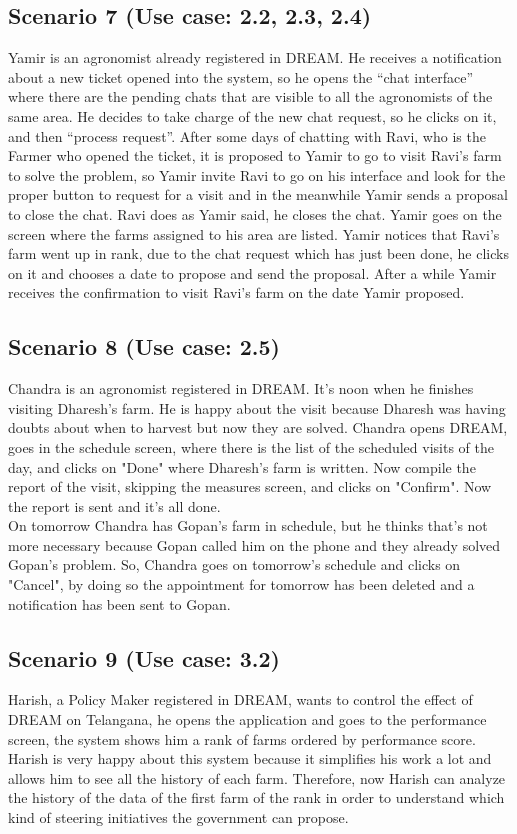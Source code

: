 \documentclass[10pt]{report}
\begin{document}
\subsection{Scenario 7 (Use case: 2.2, 2.3, 2.4)}
Yamir is an agronomist already registered in DREAM. He receives a notification about a new ticket opened into the system, so he opens the “chat interface” where there are the pending chats that are visible to all the agronomists of the same area. He decides to take charge of the new chat request, so he clicks on it, and then “process request”. After some days of chatting with Ravi, who is the Farmer who opened the ticket, it is proposed to Yamir to go to visit Ravi’s farm to solve the problem, so Yamir invite Ravi to go on his interface and look for the proper button to request for a visit and in the meanwhile Yamir sends a proposal to close the chat. Ravi does as Yamir said, he closes the chat. Yamir goes on the screen where the farms assigned to his area are listed. Yamir notices that Ravi’s farm went up in rank, due to the chat request which has just been done, he clicks on it and chooses a date to propose and send the proposal. 
After a while Yamir receives the confirmation to visit Ravi’s farm on the date Yamir proposed.

\subsection{Scenario 8 (Use case: 2.5)}
Chandra is an agronomist registered in DREAM. It's noon when he finishes visiting Dharesh’s farm. He is happy about the visit because Dharesh was having doubts about when to harvest but now they are solved. Chandra opens DREAM, goes in the schedule screen, where there is the list of the scheduled visits of the day, and clicks on "Done" where Dharesh's farm is written. Now compile the report of the visit, skipping the measures screen, and clicks on "Confirm". Now the report is sent and it's all done. \\ 
On tomorrow Chandra has Gopan's farm in schedule, but he thinks that's not more necessary because Gopan called him on the phone and they already solved Gopan's problem. So, Chandra goes on tomorrow's schedule and clicks on "Cancel", by doing so the appointment for tomorrow has been deleted and a notification has been sent to Gopan.
\subsection{Scenario 9 (Use case: 3.2)}
Harish, a Policy Maker registered in DREAM, wants to control the effect of DREAM on Telangana, he opens the application and goes to the performance screen, the system shows him a rank of farms ordered by performance score. Harish is very happy about this system because it simplifies his work a lot and allows him to see all the history of each farm. Therefore, now Harish can analyze the history of the data of the first farm of the rank in order to understand which kind of steering initiatives the government can propose.
\end{document}

